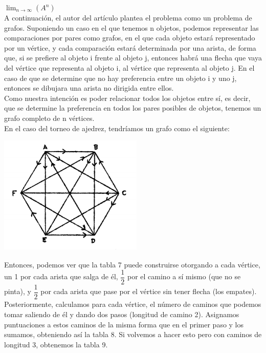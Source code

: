 \documentclass[a4paper]{article}
\begin{document}
\hspace{5cm}$\lim_{n \to \infty}(A^n)$\\

		
		


A continuación, el autor del artículo plantea el problema como un problema de grafos. Suponiendo un caso en el que tenemos n objetos, podemos representar las comparaciones por pares como grafos, en el que cada objeto estará representado por un vértice, y cada comparación estará determinada por una arista, de forma que, si se prefiere al objeto i frente al objeto j, entonces habrá una flecha que vaya del vértice que representa al objeto i, al vértice que representa al objeto j. En el caso de que se determine que no hay preferencia entre un objeto i y uno j, entonces se dibujara una arista no dirigida entre ellos.\\


Como nuestra intención es poder relacionar todos los objetos entre sí, es decir, que se determine la preferencia en todos los pares posibles de objetos, tenemos un grafo completo de n vértices.\\


En el caso del torneo de ajedrez, tendríamos un grafo como el siguiente:\\


\begin{center}
\includegraphics{grafo_completo}\\
\end{center}

Entonces, podemos ver que la tabla 7 puede construirse otorgando a cada vértice, un 1 por cada arista que salga de él, $\dfrac{1}{2}$ por el camino a sí mismo (que no se pinta), y $\dfrac{1}{2}$ por cada arista que pase por el vértice sin tener flecha (los empates). Posteriormente, calculamos para cada vértice, el número de caminos que podemos tomar saliendo de él y dando dos pasos (longitud de camino 2). Asignamos puntuaciones a estos caminos de la misma forma que en el primer paso y los sumamos, obteniendo así la tabla 8. Si volvemos a hacer esto pero con caminos de longitud 3, obtenemos la tabla 9.\\
\end{document}
